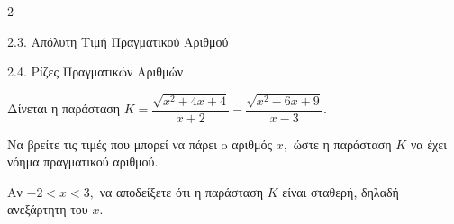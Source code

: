 \begin{ylh}{2}
    \item 2.3. Απόλυτη Τιμή Πραγματικού Αριθμού
    \item 2.4. Ρίζες Πραγματικών Αριθμών
\end{ylh}
Δίνεται η παράσταση $K = \dfrac{\sqrt{x^{2} + 4x + 4}}{x + 2} - \dfrac{\sqrt{x^{2} - 6x + 9}}{x - 3}.$
\begin{alist}
\item Να βρείτε τις τιμές που μπορεί να πάρει o αριθμός $x,$ ώστε η παράσταση $K$ να έχει νόημα πραγματικού αριθμού.
\item Αν $- 2 < x < 3,$ να αποδείξετε ότι η παράσταση $K$ είναι σταθερή, δηλαδή ανεξάρτητη του $x.$
\end{alist}

